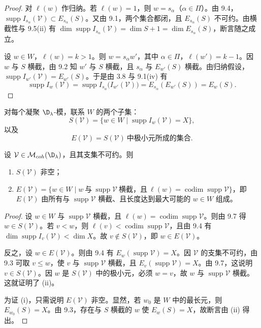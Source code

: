 \begin{proof}
对 $\ell(w)$ 作归纳。若 $\ell(w)=1$，则 $w=s_\alpha$（$\alpha\in\Pi$）。由 9.4，$\operatorname{supp}I_{s_\alpha}(\mathcal{V})\subset E_{s_\alpha}(S)$。又由 9.1，两个集合都闭，且 $E_{s_\alpha}(S)$ 不可约。由横截性与 9.5(ii) 有 $\dim\operatorname{supp}I_{s_\alpha}(\mathcal{V})=\dim S+1=\dim E_{s_\alpha}(S)$，断言随之成立。

设 $w\in W$，$\ell(w)=k>1$。则 $w=s_\alpha w'$，其中 $\alpha\in\Pi$，$\ell(w')=k-1$。因 $w$ 与 $S$ 横截，由 9.2 知 $w'$ 与 $S$ 横截，且 $s_\alpha$ 与 $E_{w'}(S)$ 横截。由归纳假设，$\operatorname{supp}I_{w'}(\mathcal{V})=E_{w'}(S)$。于是由 3.8 与 9.1(iv) 有
$$\operatorname{supp}I_w(\mathcal{V})=\operatorname{supp}I_{s_\alpha}\bigl(I_{w'}(\mathcal{V})\bigr)=E_{s_\alpha}(E_{w'}(S))=E_w(S).$$
\end{proof}

对每个凝聚 $\D_\lambda$-模，联系 $W$ 的两个子集：
$$S(\mathcal{V})=\{w\in W\mid\operatorname{supp}I_w(\mathcal{V})=X\},$$
以及
$$E(\mathcal{V})=S(\mathcal{V})\ \text{中极小元所成的集合}.$$

\begin{proposition}\label{prop:03.9.8}
设 $\mathcal{V}\in\mathcal{M}_{coh}(\D_\lambda)$，且其支集不可约。则
\begin{enumerate}[label=(\roman*)]
\item $S(\mathcal{V})$ 非空；
\item $E(\mathcal{V})=\{w\in W\mid w\ \text{与}\ \operatorname{supp}\mathcal{V}\ \text{横截，且}\ \ell(w)=\operatorname{codim}\operatorname{supp}\mathcal{V}\}$，即 $E(\mathcal{V})$ 由所有与 $\operatorname{supp}\mathcal{V}$ 横截、且长度达到最大可能的 $w\in W$ 组成。
\end{enumerate}
\end{proposition}

\begin{proof}
设 $w\in W$ 与 $\operatorname{supp}\mathcal{V}$ 横截，且 $\ell(w)=\operatorname{codim}\operatorname{supp}\mathcal{V}$。则由 9.7 得 $w\in S(\mathcal{V})$。若 $v<w$，则 $\ell(v)<\operatorname{codim}\operatorname{supp}\mathcal{V}$，且由 9.4 有 $\dim\operatorname{supp}I_v(\mathcal{V})<\dim X$。故 $v\notin S(\mathcal{V})$，即 $w\in E(\mathcal{V})$。

反之，设 $w\in E(\mathcal{V})$。则由 9.4 有 $E_w(\operatorname{supp}\mathcal{V})=X$。因 $\mathcal{V}$ 的支集不可约，由 9.3 可取 $v\le w$，使 $v$ 与 $\operatorname{supp}\mathcal{V}$ 横截，且 $E_v(\operatorname{supp}\mathcal{V})=X$。由 9.7，这说明 $v\in S(\mathcal{V})$。因 $w$ 是 $S(\mathcal{V})$ 中的极小元，必须 $w=v$，故 $w$ 与 $\operatorname{supp}\mathcal{V}$ 横截。这就证明了 (ii)。

为证 (i)，只需说明 $E(\mathcal{V})$ 非空。显然，若 $w_0$ 是 $W$ 中的最长元，则 $E_{w_0}(S)=X$。由 9.3，存在与 $S$ 横截的 $w$ 使 $E_w(S)=X$，故断言由 (ii) 得出。
\end{proof}

